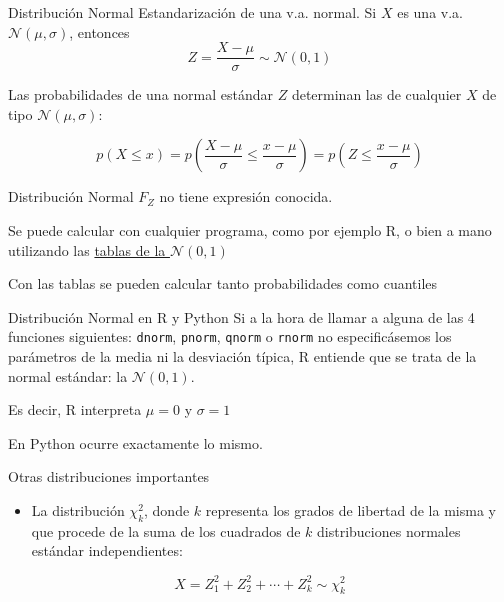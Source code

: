 \documentclass[
  ignorenonframetext,
]{beamer}
\providecommand{\tightlist}{%
  \setlength{\itemsep}{0pt}\setlength{\parskip}{0pt}}
\begin{document}
\begin{frame}{Distribución Normal}
\protect\hypertarget{distribuciuxf3n-normal-4}{}
Estandarización de una v.a. normal. Si \(X\) es una v.a.
\(\mathcal{N}(\mu,\sigma)\), entonces
\[Z=\frac{X-\mu}{\sigma}\sim\mathcal{N}(0,1)\]

Las probabilidades de una normal estándar \(Z\) determinan las de
cualquier \(X\) de tipo \(\mathcal{N}(\mu,\sigma)\):

\[p(X\le x)=p\left(\frac{X-\mu}{\sigma}\le\frac{x-\mu}{\sigma}\right)=p\left(Z\le\frac{x-\mu}{\sigma}\right)\]
\end{frame}

\begin{frame}{Distribución Normal}
\protect\hypertarget{distribuciuxf3n-normal-5}{}
\(F_Z\) no tiene expresión conocida.

Se puede calcular con cualquier programa, como por ejemplo R, o bien a
mano utilizando las
\href{https://github.com/joanby/r-basic/blob/master/teoria/TablaNormal.pdf}{tablas
de la \(\mathcal{N}(0,1)\)}

Con las tablas se pueden calcular tanto probabilidades como cuantiles
\end{frame}

\begin{frame}[fragile]{Distribución Normal en R y Python}
\protect\hypertarget{distribuciuxf3n-normal-en-r-y-python}{}
Si a la hora de llamar a alguna de las 4 funciones siguientes:
\texttt{dnorm}, \texttt{pnorm}, \texttt{qnorm} o \texttt{rnorm} no
especificásemos los parámetros de la media ni la desviación típica, R
entiende que se trata de la normal estándar: la \(\mathcal{N}(0,1)\).

Es decir, R interpreta \(\mu = 0\) y \(\sigma = 1\)

En Python ocurre exactamente lo mismo.
\end{frame}

\begin{frame}{Otras distribuciones importantes}
\protect\hypertarget{otras-distribuciones-importantes}{}
\begin{itemize}
\tightlist
\item
  La distribución \(\chi^2_k\), donde \(k\) representa los grados de
  libertad de la misma y que procede de la suma de los cuadrados de
  \(k\) distribuciones normales estándar independientes:
\end{itemize}

\[X = Z_1^2 + Z_2^2+\cdots + Z_k^2\sim \chi_k^2\]
\end{frame}
\end{document}

